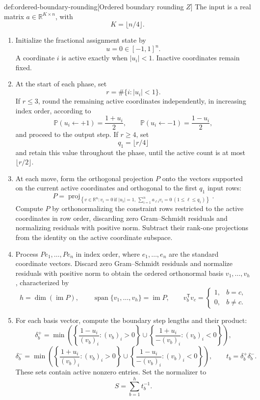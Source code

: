 \begin{algorithmv}{def:ordered-boundary-rounding}[Ordered boundary rounding $Z$]
The input is a real matrix \(a\in\mathbb R^{K\times n}\), with
\[
K=\lfloor n/4\rfloor.
\]
\begin{enumerate}
\item Initialize the fractional assignment state by
\[
u=0\in[-1,1]^n.
\]
A coordinate \(i\) is active exactly when \(|u_i|<1\). Inactive coordinates remain fixed.

\item At the start of each phase, set
\[
r=\#\{i:|u_i|<1\}.
\]
If \(r\leq3\), round the remaining active coordinates independently, in increasing index order, according to
\[
\mathbb P(u_i\leftarrow+1)=\frac{1+u_i}{2},
\qquad
\mathbb P(u_i\leftarrow-1)=\frac{1-u_i}{2},
\]
and proceed to the output step. If \(r\geq4\), set
\[
q_1=\lfloor r/4\rfloor
\]
and retain this value throughout the phase, until the active count is at most \(\lfloor r/2\rfloor\).

\item At each move, form the orthogonal projection \(P\) onto the vectors supported on the current active coordinates and orthogonal to the first \(q_1\) input rows:
\[
P=
\operatorname{proj}_{\left\{
v\in\mathbb R^n:
v_i=0\ \text{if }|u_i|=1,\ 
\sum_{i=1}^n a_{\ell i}v_i=0\ (1\leq\ell\leq q_1)
\right\}}.
\]
Compute \(P\) by orthonormalizing the constraint rows restricted to the active coordinates in row order, discarding zero Gram--Schmidt residuals and normalizing residuals with positive norm. Subtract their rank-one projections from the identity on the active coordinate subspace.

\item Process \(Pe_1,\ldots,Pe_n\) in index order, where \(e_1,\ldots,e_n\) are the standard coordinate vectors. Discard zero Gram--Schmidt residuals and normalize residuals with positive norm to obtain the ordered orthonormal basis \(v_1,\ldots,v_h\), characterized by
\[
h=\dim(\operatorname{im}P),
\qquad
\operatorname{span}\{v_1,\ldots,v_h\}=\operatorname{im}P,
\qquad
v_b^{\mathsf T}v_c=
\begin{cases}
1,&b=c,\\
0,&b\ne c.
\end{cases}
\]

\item For each basis vector, compute the boundary step lengths and their product:
\[
\delta_b^+
=
\min\left(
\left\{\frac{1-u_i}{(v_b)_i}:(v_b)_i>0\right\}
\cup
\left\{\frac{1+u_i}{-(v_b)_i}:(v_b)_i<0\right\}
\right),
\]
\[
\delta_b^-
=
\min\left(
\left\{\frac{1+u_i}{(v_b)_i}:(v_b)_i>0\right\}
\cup
\left\{\frac{1-u_i}{-(v_b)_i}:(v_b)_i<0\right\}
\right),
\qquad
t_b=\delta_b^+\delta_b^-.
\]
These sets contain active nonzero entries. Set the normalizer to
\[
S=\sum_{b=1}^h t_b^{-1}.
\]


\end{enumerate}
\end{algorithmv}
